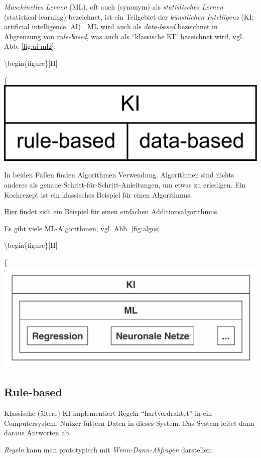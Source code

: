 \documentclass[
]{book}
\begin{document}
\emph{Maschinelles Lernen} (ML), oft auch (synonym) als \emph{statistisches Lernen} (statistical learning) bezeichnet, ist ein Teilgebiet der \emph{künstlichen Intelligenz} (KI; artificial intelligence, AI) \citep{rhys}. ML wird auch als \emph{data-based} bezeichnet in Abgrenzung von \emph{rule-based}, was auch als ``klassische KI'' bezeichnet wird, vgl. Abb. \ref{fig:ai-ml2}.

\textbackslash begin\{figure\}{[}H{]}

\{\centering \includegraphics[width=0.7\linewidth]{chunk-img/ai-ml2-1}

In beiden Fällen finden Algorithmen Verwendung.
Algorithmen sind nichts anderes als genaue Schritt-für-Schritt-Anleitungen, um etwas zu erledigen.
Ein Kochrezept ist ein klassisches Beispiel für einen Algorithmus.

\href{https://www.c-programming-simple-steps.com/images/xsum-two-numbers-h.png.pagespeed.ic.AM9WYFPgEo.webp}{Hier} findet sich ein Beispiel für einen einfachen Additionsalgorithmus.

Es gibt viele ML-Algorithmen, vgl. Abb. \ref{fig:algos}.

\textbackslash begin\{figure\}{[}H{]}

\{\centering \includegraphics[width=0.7\linewidth]{chunk-img/algos-1}

\hypertarget{rule-based}{%
\subsection{Rule-based}\label{rule-based}}

Klassische (ältere) KI implementiert Regeln ``hartverdrahtet'' in ein Computersystem.
Nutzer füttern Daten in dieses System. Das System leitet dann daraus Antworten ab.

\emph{Regeln} kann man prototypisch mit \emph{Wenn-Dann-Abfragen} darstellen:
\end{document}
